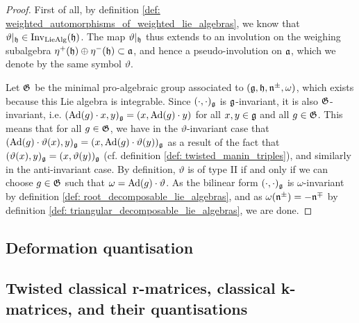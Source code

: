             \begin{proof}
                First of all, by definition \ref{def: weighted_automorphisms_of_weighted_lie_algebras}, we know that $\vartheta|_{\mathfrak{h}} \in \operatorname{Inv}_{\mathrm{Lie}\mathrm{Alg}}(\mathfrak{h})$. The map $\vartheta|_{\mathfrak{h}}$ thus extends to an involution on the weighing subalgebra $\eta^+(\mathfrak{h}) \oplus \eta^-(\mathfrak{h}) \subset \mathfrak{a}$, and hence a pseudo-involution on $\mathfrak{a}$, which we denote by the same symbol $\vartheta$.
            
                Let $\mathfrak{G}$ be the minimal pro-algebraic group associated to $(\mathfrak{g}, \mathfrak{h}, \mathfrak{n}^{\pm}, \omega)$, which exists because this Lie algebra is integrable. Since $(\cdot, \cdot)_{\mathfrak{g}}$ is $\mathfrak{g}$-invariant, it is also $\mathfrak{G}$-invariant, i.e. $(\mathrm{Ad}(g) \cdot x, y)_{\mathfrak{g}} = (x, \mathrm{Ad}(g) \cdot y)$ for all $x, y \in \mathfrak{g}$ and all $g \in \mathfrak{G}$. This means that for all $g \in \mathfrak{G}$, we have in the $\vartheta$-invariant case that $( \mathrm{Ad}(g) \cdot \vartheta(x), y )_{\mathfrak{g}} = ( x, \mathrm{Ad}(g) \cdot \vartheta(y) )_{\mathfrak{g}}$ as a result of the fact that $( \vartheta(x), y )_{\mathfrak{g}} = ( x, \vartheta(y) )_{\mathfrak{g}}$ (cf. definition \ref{def: twisted_manin_triples}), and similarly in the anti-invariant case. By definition, $\vartheta$ is of type II if and only if we can choose $g \in \mathfrak{G}$ such that $\omega = \mathrm{Ad}(g) \cdot \vartheta$.  As the bilinear form $(\cdot, \cdot)_{\mathfrak{g}}$ is $\omega$-invariant by definition \ref{def: root_decomposable_lie_algebras}, and as $\omega(\mathfrak{n}^{\pm}) = -\mathfrak{n}^{\mp}$ by definition \ref{def: triangular_decomposable_lie_algebras}, we are done.
            \end{proof}

    \subsection{Deformation quantisation}

    \subsection{Twisted classical r-matrices, classical k-matrices, and their quantisations}